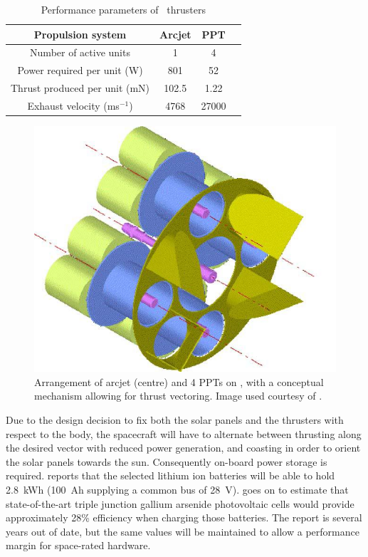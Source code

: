 \begin{table} [h]
  \caption{Performance parameters of \BW\ thrusters}
  \label{tab:BW1-performance}
  \begin{center}
    \begin{tabular} {cccc}\toprule
      Propulsion system & Arcjet & PPT \\\midrule
      Number of active units & 1 & 4 \\
      Power required per unit (W) & 801 & 52\\
      Thrust produced per unit (mN) & 102.5 & 1.22\\
      Exhaust velocity (ms$^{-1}$) & 4768 & 27000\\\bottomrule
    \end{tabular}
  \end{center}
\end{table}

\begin{figure} [h]
  \begin{center}
    \includegraphics[scale=0.25]{Images/thrust-vectoring.JPG}
  \end{center}
  \caption{Arrangement of arcjet (centre) and 4 PPTs on \BW, with a conceptual mechanism allowing for thrust vectoring. Image used courtesy of \textcite{Roeser2006}.}
  \label{fig:Thrust-vectoring}
\end{figure}

Due to the design decision to fix both the solar panels and the thrusters with respect to the body, the spacecraft will have to alternate between thrusting along the desired vector with reduced power generation, and coasting in order to orient the solar panels towards the sun. Consequently on-board power storage is required. \textcite{Falke2004} reports that the selected lithium ion batteries will be able to hold 2.8~kWh (100~Ah supplying a common bus of 28~V). \citeauthor{Falke2004} goes on to estimate that state-of-the-art triple junction gallium arsenide photovoltaic cells would provide approximately 28\% efficiency when charging those batteries. The report is several years out of date, but the same values will be maintained to allow a performance margin for space-rated hardware.

